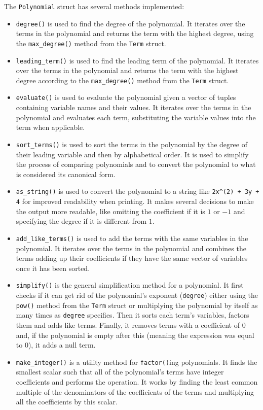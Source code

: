 The \verb|Polynomial| struct has several methods implemented:

\begin{itemize}
    \item \verb|degree()| is used to find the degree of the polynomial. It iterates over the terms in the polynomial and returns the term with the highest degree, using the \verb|max_degree()| method from the \texttt{Term} struct.
    \item \verb|leading_term()| is used to find the leading term of the polynomial. It iterates over the terms in the polynomial and returns the term with the highest degree according to the \verb|max_degree()| method from the \texttt{Term} struct.
    \item \verb|evaluate()| is used to evaluate the polynomial given a vector of tuples containing variable names and their values. It iterates over the terms in the polynomial and evaluates each term, substituting the variable values into the term when applicable.
    \item \verb|sort_terms()| is used to sort the terms in the polynomial by the degree of their leading variable and then by alphabetical order. It is used to simplify the process of comparing polynomials and to convert the polynomial to what is considered its canonical form.
    \item \verb|as_string()| is used to convert the polynomial to a string like \verb|2x^(2) + 3y + 4| for improved readability when printing. It makes several decisions to make the output more readable, like omitting the coefficient if it is $1$ or $-1$ and specifying the degree if it is different from $1$.
    \item \verb|add_like_terms()| is used to add the terms with the same variables in the polynomial. It iterates over the terms in the polynomial and combines the terms adding up their coefficients if they have the same vector of variables once it has been sorted.
    \item \verb|simplify()| is the general simplification method for a polynomial. It first checks if it can get rid of the polynomial's exponent (\verb|degree|) either using the \verb|pow()| method from the \texttt{Term} struct or multiplying the polynomial by itself as many times as \verb|degree| specifies. Then it sorts each term's variables, factors them and adds like terms. Finally, it removes terms with a coefficient of $0$ and, if the polynomial is empty after this (meaning the expression was equal to $0$), it adds a null term.
    \item \verb|make_integer()| is a utility method for \verb|factor()|ing polynomials. It finds the smallest scalar such that all of the polynomial's terms have integer coefficients and performs the operation. It works by finding the least common multiple of the denominators of the coefficients of the terms and multiplying all the coefficients by this scalar. 

\end{itemize}
